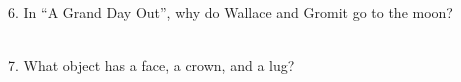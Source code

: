 \begin{frame}
\begin{center}
\Large
6. In ``A Grand Day Out'', why do Wallace and Gromit go to the moon?
\\
\\
\end{center}
\end{frame}
\begin{frame}
\begin{center}
\Large
7. What object has a face, a crown, and a lug?
\\
\\
\end{center}
\end{frame}
